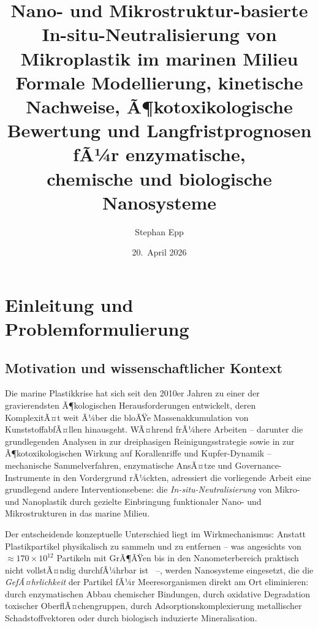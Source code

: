 ﻿\documentclass[12pt,a4paper]{article}
\title{\textbf{Nano- und Mikrostruktur-basierte In-situ-Neutralisierung von\\
Mikroplastik im marinen Milieu}\\[0.4em]
\large Formale Modellierung, kinetische Nachweise, Ã¶kotoxikologische\\
Bewertung und Langfristprognosen fÃ¼r enzymatische,\\
chemische und biologische Nanosysteme}
\author{Stephan Epp}
\date{20.~April 2026}
\theoremstyle{definition}
\theoremstyle{remark}
\begin{document}
\maketitle
\tableofcontents
\newpage

\section{Einleitung und Problemformulierung}
\label{sec:einleitung}

\subsection{Motivation und wissenschaftlicher Kontext}

Die marine Plastikkrise hat sich seit den 2010er Jahren zu einer der gravierendsten
Ã¶kologischen Herausforderungen entwickelt, deren KomplexitÃ¤t weit Ã¼ber die bloÃŸe
Massenakkumulation von KunststoffabfÃ¤llen hinausgeht. WÃ¤hrend frÃ¼here Arbeiten --
darunter die grundlegenden Analysen in \cite{cleanocn_epp2026} zur dreiphasigen
Reinigungsstrategie sowie in \cite{ocnscnce_epp2026} zur Ã¶kotoxikologischen
Wirkung auf Korallenriffe und Kupfer-Dynamik -- mechanische Sammelverfahren,
enzymatische AnsÃ¤tze und Governance-Instrumente in den Vordergrund rÃ¼ckten,
adressiert die vorliegende Arbeit eine grundlegend andere Interventionsebene:
die \emph{In-situ-Neutralisierung} von Mikro- und Nanoplastik durch gezielte
Einbringung funktionaler Nano- und Mikrostrukturen in das marine Milieu.

Der entscheidende konzeptuelle Unterschied liegt im Wirkmechanismus:
Anstatt Plastikpartikel physikalisch zu sammeln und zu entfernen -- was angesichts
von $\approx 170 \times 10^{12}$ Partikeln mit GrÃ¶ÃŸen bis in den Nanometerbereich
praktisch nicht vollstÃ¤ndig durchfÃ¼hrbar ist~\cite{eriksen2014plastic} --,
werden Nanosysteme eingesetzt, die die \emph{GefÃ¤hrlichkeit} der Partikel fÃ¼r
Meeresorganismen direkt am Ort eliminieren: durch enzymatischen Abbau chemischer
Bindungen, durch oxidative Degradation toxischer OberflÃ¤chengruppen, durch
Adsorptionskomplexierung metallischer Schadstoffvektoren oder durch biologisch
induzierte Mineralisation.
\end{document}
